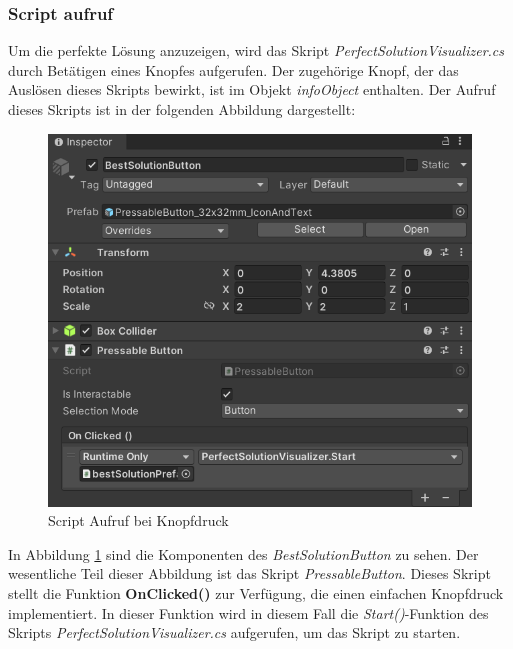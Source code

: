 \subsubsection{Script aufruf}
Um die perfekte Lösung anzuzeigen, wird das Skript \textit{PerfectSolutionVisualizer.cs} durch Betätigen eines Knopfes
aufgerufen. Der zugehörige Knopf, der das Auslösen dieses Skripts bewirkt, ist im Objekt \textit{infoObject} enthalten.
Der Aufruf dieses Skripts ist in der folgenden Abbildung dargestellt:
\begin{figure}[h]
    \centering
    \includegraphics[scale=0.8]{images/perfSolBut}
    \caption{Script Aufruf bei Knopfdruck}
    \label{fig:ScrAuf}
\end{figure}

In Abbildung \ref{fig:ScrAuf} sind die Komponenten des \textit{BestSolutionButton} zu sehen. Der wesentliche Teil dieser
Abbildung ist das Skript \textit{PressableButton}. Dieses Skript stellt die Funktion \textbf{OnClicked()} zur Verfügung,
die einen einfachen Knopfdruck implementiert. In dieser Funktion wird in diesem Fall die \textit{Start()}-Funktion des
Skripts \textit{PerfectSolutionVisualizer.cs} aufgerufen, um das Skript zu starten.

